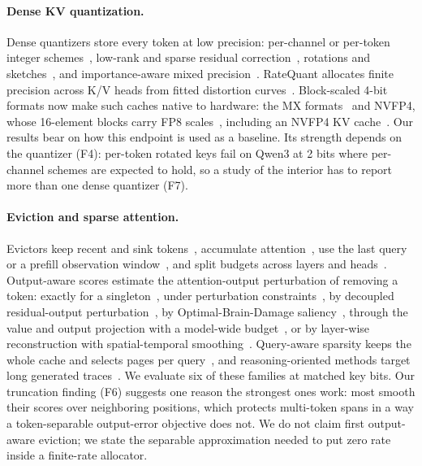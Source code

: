 \documentclass{article}
\theoremstyle{definition}
\begin{document}
\paragraph{Dense KV quantization.}
Dense quantizers store every token at low precision: per-channel or per-token integer schemes~\citep{liu2024kivi,hooper2024kvquant}, low-rank and sparse residual correction~\citep{kang2024gear}, rotations and sketches~\citep{zandieh2024qjl,zandieh2025turboquant}, and importance-aware mixed precision~\citep{yang2024mikv,he2024zipcache}.  RateQuant allocates finite precision across K/V heads from fitted distortion curves~\citep{zuo2026ratequant}.  Block-scaled 4-bit formats now make such caches native to hardware: the MX formats~\citep{ocp2023mx} and NVFP4, whose 16-element blocks carry FP8 scales~\citep{alvarez2025nvfp4}, including an NVFP4 KV cache~\citep{alvarez2025nvfp4kv}.  Our results bear on how this endpoint is used as a baseline.  Its strength depends on the quantizer (F4): per-token rotated keys fail on Qwen3 at 2 bits where per-channel schemes are expected to hold, so a study of the interior has to report more than one dense quantizer (F7).

\paragraph{Eviction and sparse attention.}
Evictors keep recent and sink tokens~\citep{xiao2024streamingllm}, accumulate attention~\citep{zhang2023h2o,liu2023scissorhands}, use the last query~\citep{oren2024tova} or a prefill observation window~\citep{li2024snapkv}, and split budgets across layers and heads~\citep{cai2024pyramidkv,feng2024adakv}.  Output-aware scores estimate the attention-output perturbation of removing a token: exactly for a singleton~\citep{goel2025caote}, under perturbation constraints~\citep{feng2026criticalkv}, by decoupled residual-output perturbation~\citep{zhang2026dropkv}, by Optimal-Brain-Damage saliency~\citep{gu2026obcache}, through the value and output projection with a model-wide budget~\citep{mai2026laprox}, or by layer-wise reconstruction with spatial-temporal smoothing~\citep{an2026restkv}.  Query-aware sparsity keeps the whole cache and selects pages per query~\citep{tang2024quest}, and reasoning-oriented methods target long generated traces~\citep{cai2025rkv,mao2026triattention}.  We evaluate six of these families at matched key bits.  Our truncation finding (F6) suggests one reason the strongest ones work: most smooth their scores over neighboring positions, which protects multi-token spans in a way a token-separable output-error objective does not.  We do not claim first output-aware eviction; we state the separable approximation needed to put zero rate inside a finite-rate allocator.
\end{document}
